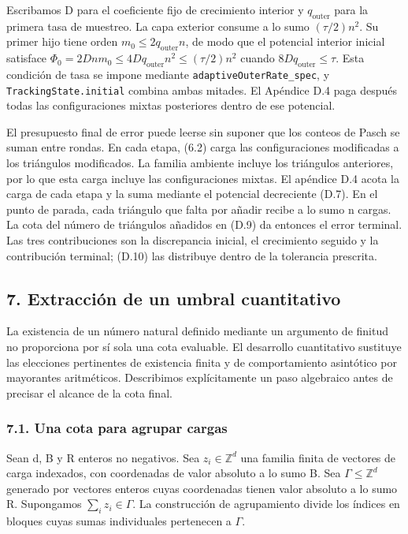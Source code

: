 \documentclass[spanish,11pt,a4paper]{article}
\begin{document}
Escribamos D para el coeficiente fijo de crecimiento interior y \(q_{\mathrm{outer}}\) para la primera tasa de muestreo. La capa exterior consume a lo sumo \((\tau/2)n^2\). Su primer hijo tiene orden \(m_0\leq2q_{\mathrm{outer}}n\), de modo que el potencial interior inicial satisface \(\Phi_0=2Dnm_0\leq4Dq_{\mathrm{outer}}n^2\leq(\tau/2)n^2\) cuando \(8Dq_{\mathrm{outer}}\leq\tau\). Esta condición de tasa se impone mediante \texttt{adaptive\allowbreak{}Outer\allowbreak{}Rate\_\allowbreak{}spec}, y \texttt{Tracking\allowbreak{}State.\allowbreak{}initial} combina ambas mitades. El Apéndice D.4 paga después todas las configuraciones mixtas posteriores dentro de ese potencial.

El presupuesto final de error puede leerse sin suponer que los conteos de Pasch se suman entre rondas. En cada etapa, (6.2) carga las configuraciones modificadas a los triángulos modificados. La familia ambiente incluye los triángulos anteriores, por lo que esta carga incluye las configuraciones mixtas. El apéndice D.4 acota la carga de cada etapa y la suma mediante el potencial decreciente (D.7). En el punto de parada, cada triángulo que falta por añadir recibe a lo sumo n cargas. La cota del número de triángulos añadidos en (D.9) da entonces el error terminal. Las tres contribuciones son la discrepancia inicial, el crecimiento seguido y la contribución terminal; (D.10) las distribuye dentro de la tolerancia prescrita.

\subsection{7. Extracción de un umbral cuantitativo}\label{extracciuxf3n-de-un-umbral-cuantitativo}

La existencia de un número natural definido mediante un argumento de finitud no proporciona por sí sola una cota evaluable. El desarrollo cuantitativo sustituye las elecciones pertinentes de existencia finita y de comportamiento asintótico por mayorantes aritméticos. Describimos explícitamente un paso algebraico antes de precisar el alcance de la cota final.

\subsubsection{7.1. Una cota para agrupar cargas}\label{una-cota-para-agrupar-cargas}

Sean d, B y R enteros no negativos. Sea \(z_i\in\mathbb Z^d\) una familia finita de vectores de carga indexados, con coordenadas de valor absoluto a lo sumo B. Sea \(\Gamma\leq\mathbb Z^d\) generado por vectores enteros cuyas coordenadas tienen valor absoluto a lo sumo R. Supongamos \(\sum_i z_i\in\Gamma\). La construcción de agrupamiento divide los índices en bloques cuyas sumas individuales pertenecen a \(\Gamma\).
\end{document}
